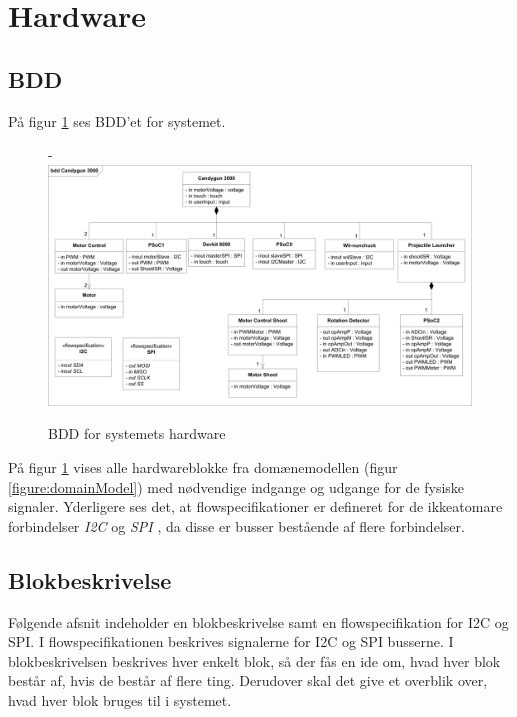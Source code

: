 \section{Hardware}

\subsection{BDD}
\label{afsnit:BDD}
På figur \ref{figure:bddDiagram} ses BDD'et for systemet.

\begin{figure}[H]
	\begin{adjustwidth}{-3cm}{-\rightmargin}
	\centering
	\includegraphics[width=0.85\paperwidth]{SystemArkitektur/images/BDD_overordnet1}
	\caption{BDD for systemets hardware}
	\label{figure:bddDiagram}
	\end{adjustwidth}
\end{figure}

\noindent På figur \ref{figure:bddDiagram} vises alle hardwareblokke fra domænemodellen (figur \ref{figure:domainModel}) med nødvendige indgange og udgange for de fysiske signaler. Yderligere ses det, at flowspecifikationer er defineret for de ikkeatomare forbindelser \textit{I2C}\cite{i2cbus} \cite{I2C} og \textit{SPI} \cite{spibus}, da disse er busser bestående af flere forbindelser.

\subsection{Blokbeskrivelse}
Følgende afsnit indeholder en blokbeskrivelse samt en flowspecifikation for I2C og SPI. I flowspecifikationen beskrives signalerne for I2C og SPI busserne.  I blokbeskrivelsen beskrives hver enkelt blok, så der fås en ide om, hvad hver blok består af, hvis de består af flere ting. Derudover skal det give et overblik over, hvad hver blok bruges til i systemet. \newline \newline

